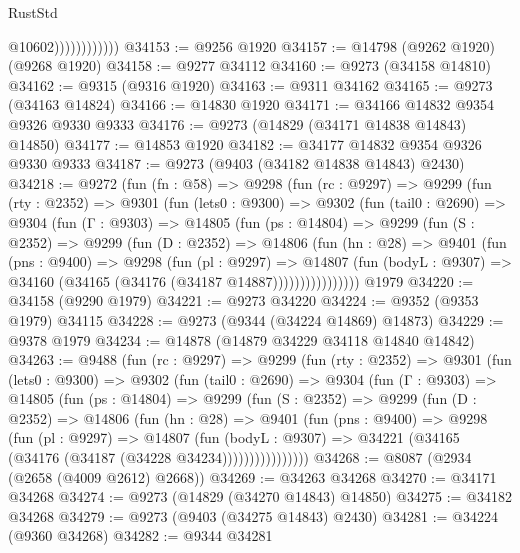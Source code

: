 \begin{lexlean}{RustStd}
\begin{coremodule}
{\begin{coremodule}
{{{{{{{{{{{{{{{{{{{{{{{{{{{{{{{{{{{{{{{{{{{{{{{{{{{{{{{                            @10602))))))))))))
@34153 := @9256 @1920
@34157 := @14798 (@9262 @1920) (@9268 @1920)
@34158 := @9277 @34112
@34160 := @9273 (@34158 @14810)
@34162 := @9315 (@9316 @1920)
@34163 := @9311 @34162
@34165 := @9273 (@34163 @14824)
@34166 := @14830 @1920
@34171 := @34166 @14832 @9354 @9326 @9330 @9333
@34176 := @9273 (@14829 (@34171 @14838 @14843) @14850)
@34177 := @14853 @1920
@34182 := @34177 @14832 @9354 @9326 @9330 @9333
@34187 := @9273 (@9403 (@34182 @14838 @14843) @2430)
@34218 := @9272
    (fun (fn : @58) =>
    @9298
      (fun (rc : @9297) =>
      @9299
        (fun (rty : @2352) =>
        @9301
          (fun (lets0 : @9300) =>
          @9302
            (fun (tail0 : @2690) =>
            @9304
              (fun (Γ : @9303) =>
              @14805
                (fun (ps : @14804) =>
                @9299
                  (fun (S : @2352) =>
                  @9299
                    (fun (D : @2352) =>
                    @14806
                      (fun (hn : @28) =>
                      @9401
                        (fun (pns : @9400) =>
                        @9298
                          (fun (pl : @9297) =>
                          @14807
                            (fun (bodyL : @9307) =>
                            @34160 (@34165 (@34176 (@34187 @14887))))))))))))))))
    @1979
@34220 := @34158 (@9290 @1979)
@34221 := @9273 @34220
@34224 := @9352 (@9353 @1979) @34115
@34228 := @9273 (@9344 (@34224 @14869) @14873)
@34229 := @9378 @1979
@34234 := @14878 (@14879 @34229 @34118 @14840 @14842)
@34263 := @9488
    (fun (rc : @9297) =>
    @9299
      (fun (rty : @2352) =>
      @9301
        (fun (lets0 : @9300) =>
        @9302
          (fun (tail0 : @2690) =>
          @9304
            (fun (Γ : @9303) =>
            @14805
              (fun (ps : @14804) =>
              @9299
                (fun (S : @2352) =>
                @9299
                  (fun (D : @2352) =>
                  @14806
                    (fun (hn : @28) =>
                    @9401
                      (fun (pns : @9400) =>
                      @9298
                        (fun (pl : @9297) =>
                        @14807
                          (fun (bodyL : @9307) =>
                          @34221 (@34165 (@34176 (@34187 (@34228 @34234))))))))))))))))
@34268 := @8087 (@2934 (@2658 (@4009 @2612) @2668))
@34269 := @34263 @34268
@34270 := @34171 @34268
@34274 := @9273 (@14829 (@34270 @14843) @14850)
@34275 := @34182 @34268
@34279 := @9273 (@9403 (@34275 @14843) @2430)
@34281 := @34224 (@9360 @34268)
@34282 := @9344 @34281
}}}}}}}}}}}}}}}}}}}}}}}}}}}}}}}}}}}}}}}}}}}}}}}}}}}}}}}
\end{coremodule}}
\end{coremodule}
\end{lexlean}
